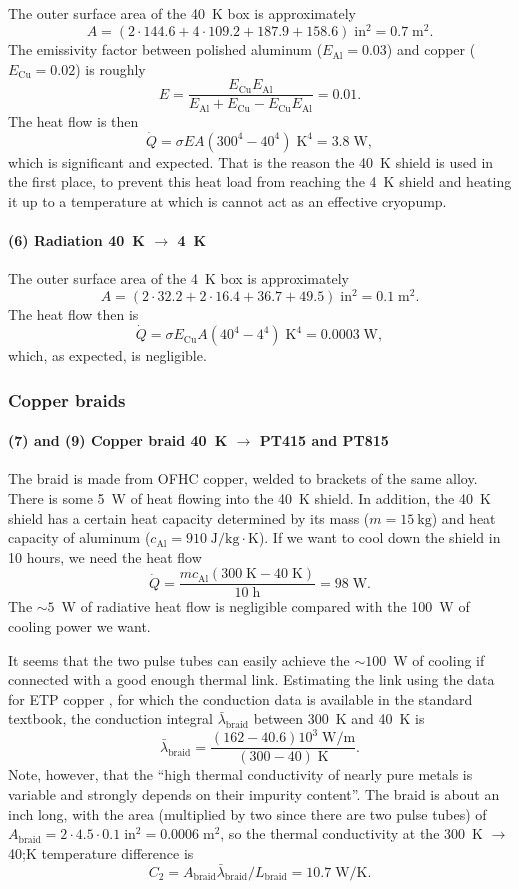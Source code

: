 The outer surface area of the 40~K box is approximately
%
\[
   A=(2\cdot144.6+4\cdot109.2+187.9+158.6)\;\text{in}^2=0.7\;\text{m}^2.
\]
%
The emissivity factor between polished aluminum ($E_\text{Al}=0.03$) and copper
($E_\text{Cu}=0.02$) is roughly
%
\[
   E=\frac{E_\text{Cu}E_\text{Al}}{E_\text{Al}+E_\text{Cu}-E_\text{Cu}E_\text{Al}}=0.01.
\]
%
The heat flow is then
%
\[
   \dot Q=\sigma EA(300^4-40^4)\;\text{K}^4=3.8\;\text{W},
\]
%
which is significant and expected. That is the reason the 40~K shield is used in
the first place, to prevent this heat load from reaching the 4~K shield and
heating it up to a temperature at which is cannot act as an effective cryopump.

\paragraph{(6) Radiation 40~K $\rightarrow$ 4~K}

The outer surface area of the 4~K box is approximately
%
\[
   A=(2\cdot32.2+2\cdot16.4+36.7+49.5)\;\text{in}^2=0.1\;\text{m}^2.
\]
%
The heat flow then is
%
\[
   \dot Q=\sigma E_\text{Cu}A(40^4-4^4)\;\text{K}^4=0.0003\;\text{W},
\]
%
which, as expected, is negligible.

\subsubsection{Copper braids}

\paragraph{(7) and (9) Copper braid 40~K $\rightarrow$ PT415 and PT815}

The braid is made from OFHC copper, welded to brackets of the same alloy.  There
is some 5~W of heat flowing into the 40~K shield. In addition, the 40~K shield
has a certain heat capacity determined by its mass ($m=15~\text{kg}$) and heat
capacity of aluminum ($c_\text{Al}=910\;\text{J/kg}\cdot\text{K}$). If we want
to cool down the shield in 10 hours, we need the heat flow
%
\[
   \dot
   Q=\frac{mc_\text{Al}(300\;\text{K}-40\;\text{K})}{10\;\text{h}}=98\;\text{W}.
\]
%
The $\sim5$~W of radiative heat flow is negligible compared with the 100~W of
cooling power we want.

It seems that the two pulse tubes can easily achieve the $\sim100$~W of cooling
if connected with a good enough thermal link. Estimating the link using the data
for ETP copper \cite[Appendix 2.1]{ekin2006experimental}, for which the
conduction data is available in the standard textbook, the conduction
integral $\bar\lambda_\text{braid}$ between 300~K and 40~K is
%
\[
   \bar\lambda_\text{braid}=\frac{(162-40.6)10^3\;\text{W/m}}{(300-40)\;\text{K}}.
\]
%
Note, however, that the ``high thermal conductivity of nearly pure metals is
variable and strongly depends on their impurity content''. The braid is about an
inch long, with the area (multiplied by two since there are two pulse tubes) of
$A_\text{braid}=2\cdot4.5\cdot0.1\;\text{in}^2=0.0006\;\text{m}^2$, so the
thermal conductivity at the 300~K $\rightarrow$ 40;K temperature difference is
%
\[
   C_2=A_\text{braid}\bar\lambda_\text{braid}/L_\text{braid}=10.7\;\text{W/K}.
\]

